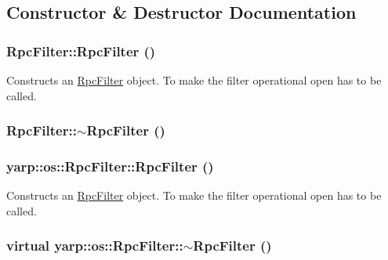 \subsection{Constructor \& Destructor Documentation}
\hypertarget{classyarp_1_1os_1_1_rpc_filter_a6be8523a6258d84266a57734c907b70c}{
\subsubsection[{RpcFilter}]{\setlength{\rightskip}{0pt plus 5cm}RpcFilter::RpcFilter ()}}
\label{classyarp_1_1os_1_1_rpc_filter_a6be8523a6258d84266a57734c907b70c}
Constructs an {\ttfamily \hyperlink{classyarp_1_1os_1_1_rpc_filter}{RpcFilter}} object. To make the filter operational {\ttfamily open} has to be called. \hypertarget{classyarp_1_1os_1_1_rpc_filter_abcf7b927eb6c44e70087d44e72a9da52}{
\subsubsection[{$\sim$RpcFilter}]{\setlength{\rightskip}{0pt plus 5cm}RpcFilter::$\sim$RpcFilter ()}}
\label{classyarp_1_1os_1_1_rpc_filter_abcf7b927eb6c44e70087d44e72a9da52}
\hypertarget{classyarp_1_1os_1_1_rpc_filter_aff16f065e6f387df20b2055f50b3b4df}{
\subsubsection[{RpcFilter}]{\setlength{\rightskip}{0pt plus 5cm}yarp::os::RpcFilter::RpcFilter ()}}
\label{classyarp_1_1os_1_1_rpc_filter_aff16f065e6f387df20b2055f50b3b4df}
Constructs an {\ttfamily \hyperlink{classyarp_1_1os_1_1_rpc_filter}{RpcFilter}} object. To make the filter operational {\ttfamily open} has to be called. \hypertarget{classyarp_1_1os_1_1_rpc_filter_a522b392967835a22401e65f7d3379869}{
\subsubsection[{$\sim$RpcFilter}]{\setlength{\rightskip}{0pt plus 5cm}virtual yarp::os::RpcFilter::$\sim$RpcFilter ()}}
\label{classyarp_1_1os_1_1_rpc_filter_a522b392967835a22401e65f7d3379869}


